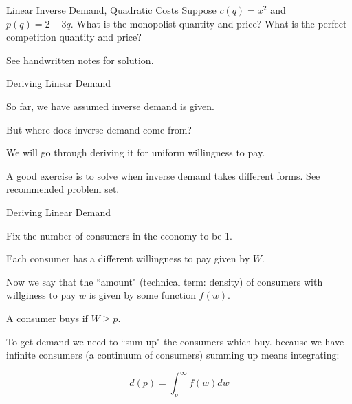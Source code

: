 \documentclass[aspectratio=169]{beamer}
\newenvironment{wideitemize}{\itemize\addtolength{\itemsep}{10pt}}{\enditemize}
\begin{document}
\begin{frame}{Linear Inverse Demand, Quadratic Costs}
Suppose $c(q)=x^2$ and $p(q)=2-3q$. What is the monopolist quantity and price? What is the perfect competition quantity and price?

\vspace{5mm}

See handwritten notes for solution.

\end{frame}


\begin{frame}{Deriving Linear Demand}

\begin{wideitemize}
        \item So far, we have assumed inverse demand is given.
        \item But where does inverse demand come from?
        \item We will go through deriving it for uniform willingness to pay.
        \item A good exercise is to solve when inverse demand takes different forms. See recommended problem set.
        
\end{wideitemize}
\end{frame}

\begin{frame}{Deriving Linear Demand}
\begin{wideitemize}
        \item Fix the number of consumers in the economy to be 1.
        \item Each consumer has a different willingness to pay given by $W$.
        \item Now we say that the ``amount" (technical term: density) of consumers with willginess to pay $w$ is given by some function $f(w)$.
        \item A consumer buys if $W\geq p$.
        \item To get demand we need to ``sum up" the consumers which buy. because we have infinite consumers (a continuum of consumers) summing up means integrating:
        
        \[d(p) = \int^{\infty}_p f(w)dw\]
\end{wideitemize}
\end{frame}
\end{document}
